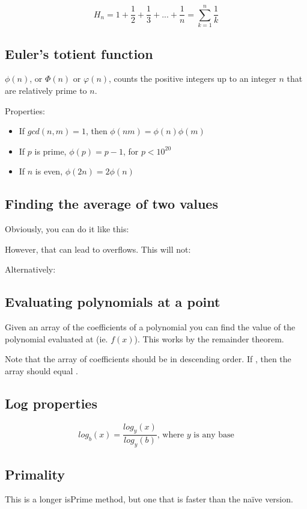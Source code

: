 $$H_n = 1 + \frac{1}{2} + \frac{1}{3} + ... + \frac{1}{n} = \sum_{k=1}^n \frac{1}{k}$$

\subsection*{Euler's totient function}

$\phi (n)$, or $\Phi (n)$ or $\varphi (n)$, counts the positive integers up to an integer $n$ that are relatively prime to $n$.

Properties:
\begin{itemize}
    \item If $gcd(n, m) = 1$, then $\phi (nm) = \phi (n) \phi (m)$
    \item If $p$ is prime, $\phi (p) = p-1$, for $p < 10^{20}$
    \item If $n$ is even, $\phi (2n) = 2 \phi(n)$
\end{itemize}

\subsection*{Finding the average of two values}

Obviously, you can do it like this: 

However, that can lead to overflows. This will not: 

Alternatively: 

\subsection*{Evaluating polynomials at a point}

Given an array of the coefficients of a polynomial you can find the value of the polynomial evaluated at  (ie. $f(x)$). This works by the remainder theorem.



Note that the array of coefficients should be in descending order. If , then the array should equal .

\subsection*{Log properties}

$$log_b(x) = \frac{log_y(x)}{log_y(b)} \text{, where } y \text{ is any base}$$

\subsection*{Primality}

This is a longer isPrime method, but one that is faster than the naïve version.



\newpage